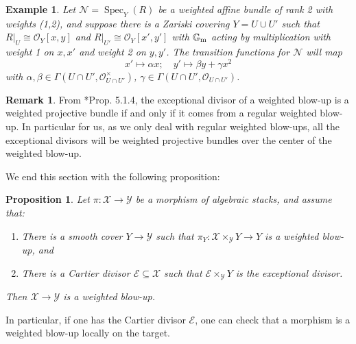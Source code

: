 \documentclass{amsart}
\newcommand{\bG}{\mathbb{G}}
\newcommand{\cE}{\mathcal{E}}
\newcommand{\cN}{\mathcal{N}}
\newcommand{\cO}{\mathcal{O}}
\newcommand{\cX}{\mathcal{X}}
\newcommand{\cY}{\mathcal{Y}}
\newcommand{\spec}{\operatorname{Spec}}
\newcommand{\Gm}{\bG_{{\rm m}}}
\newtheorem{example}[theorem]{Example}
\newtheorem{Prop}[theorem]{Proposition}
\theoremstyle{definition}
\newtheorem{Remark}[theorem]{Remark}
\begin{document}
\begin{example}\label{twistedweightedvectorbundle}
Let $\cN=\spec_Y(R)$ be a weighted affine bundle of rank 2 with weights (1,2), and suppose
there is a Zariski covering $Y=U\cup U'$ such that $R|_U\cong \cO_Y[x,y]$ and $R|_{U'}\cong \cO_Y[x',y']$ with $\Gm$ acting by multiplication with weight 1 on $x,x'$ and weight 2 on $y,y'$.
The transition functions for $\cN$ will map $$x' \mapsto \alpha x;  \quad y' \mapsto \beta y+\gamma x^2$$ with $\alpha, \beta \in \Gamma(U \cap U', \cO^\times_{U \cap U'})$, $\gamma \in \Gamma(U \cap U', \cO_{U \cap U'})$. 
\end{example}

\begin{Remark}
    From \cite{QR}*{Prop. 5.1.4}, the exceptional divisor of a weighted blow-up is a weighted projective bundle if and only if it comes from a {regular} weighted blow-up. In particular for us, as we only deal with {regular} weighted blow-ups, all the exceptional divisors will be weighted projective bundles over the center of the weighted blow-up.
\end{Remark}
We end this section with the following proposition:
\begin{Prop}\label{prop_checking_wblowup_smooth_locally}
    Let $\pi:\cX\to \cY$ be a morphism of algebraic stacks, and assume that:
    \begin{enumerate}
    \item There is a smooth cover $Y\to \cY$ such that $\pi_Y:\cX\times_{\cY}Y\to Y$ is a weighted blow-up, and
        \item There is a Cartier divisor $\cE\subseteq \cX$ such that $\cE\times_\cY Y$ is the exceptional divisor.
    \end{enumerate}
    Then $\cX\to \cY$ is a weighted blow-up.
\end{Prop}
In particular, if one has the Cartier divisor $\cE$, one can check that a morphism is a weighted blow-up locally on the target.
\end{document}
